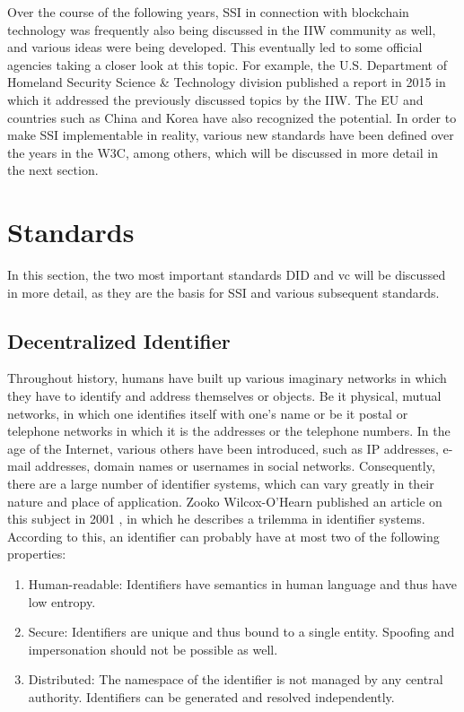         Over the course of the following years, \ac{SSI} in connection with blockchain technology was frequently also being discussed in the \ac{IIW} community as well, and various ideas were being developed. This eventually led to some official agencies taking a closer look at this topic. For example, the U.S. Department of Homeland Security Science \& Technology division published a report in 2015 in which it addressed the previously discussed topics by the \ac{IIW}. The EU and countries such as China and Korea have also recognized the potential. In order to make \ac{SSI} implementable in reality, various new standards have been defined over the years in the W3C, among others, which will be discussed in more detail in the next section. \cite[p. 6]{preukschat_self-sovereign_2021}
        
   	\section{Standards}\label{section: standards}
	    In this section, the two most important standards \acf{DID} and \acf{vc} will be discussed in more detail, as they are the basis for \ac{SSI} and various subsequent standards.
        
	    \subsection{Decentralized Identifier}\label{subsection: did}
	    
	    Throughout history, humans have built up various imaginary networks in which they have to identify and address themselves or objects. Be it physical, mutual networks, in which one identifies itself with one's name or be it postal or telephone networks in which it is the addresses or the telephone numbers. In the age of the Internet, various others have been introduced, such as IP addresses, e-mail addresses, domain names or usernames in social networks. Consequently, there are a large number of identifier systems, which can vary greatly in their nature and place of application. Zooko Wilcox-O'Hearn published an article on this subject in 2001 \cite{wilcox-ohearn_names_2001}, in which he describes a trilemma in identifier systems. According to this, an identifier can probably have at most two of the following properties: \cite[pp. 183-186]{preukschat_self-sovereign_2021}
	    
	    \begin{enumerate}
        	\item Human-readable: Identifiers have semantics in human language and thus have low entropy. 
        	\item Secure: Identifiers are unique and thus bound to a single entity. Spoofing and impersonation should not be possible as well.
        	\item Distributed: The namespace of the identifier is not managed by any central authority. Identifiers can be generated and resolved independently.
        \end{enumerate}
        
